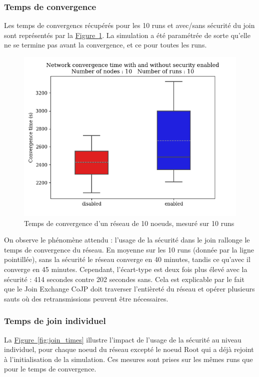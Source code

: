 \documentclass[]{report}
\newcommand{\wordlink}[2]{\hyperref[#2]{#1~\ref{#2}}}
\begin{document}
\subsubsection{Temps de convergence}

Les temps de convergencs récupérés pour les 10 runs et avec/sans sécurité du join sont représentés par la \wordlink{Figure}{fig:convergence}. La simulation a été paramétrée de sorte qu'elle ne se termine pas avant la convergence, et ce pour toutes les runs.

	\begin{figure}[!h]
	\centering
	\includegraphics[width=0.7\linewidth]{results/secjoin/boxesTimeConvergence10.png}
	\caption{Temps de convergence d'un réseau de 10 noeuds, mesuré sur 10 runs}
	\label{fig:convergence}
	\end{figure}

\vspace{0.1cm}
On observe le phénomène attendu : l'usage de la sécurité dans le join rallonge le temps de convergence du réseau. En moyenne sur les 10 runs (donnée par la ligne pointillée), sans la sécurité le réseau converge en 40 minutes, tandis ce qu'avec il converge en 45 minutes. Cependant, l'écart-type est deux fois plus élevé avec la sécurité : 414 secondes contre 202 secondes sans. Cela est explicable par le fait que le Join Exchange CoJP doit traverser l'entièreté du réseau et opérer plusieurs sauts où des retransmissions peuvent être nécessaires.

\newpage


\subsubsection{Temps de join individuel}

La \wordlink{Figure}{fig:join_times} illustre l'impact de l'usage de la sécurité au niveau individuel, pour chaque noeud du réseau excepté le noeud Root qui a déjà rejoint à l'initialisation de la simulation. Ces mesures sont prises sur les mêmes runs que pour le temps de convergence. 
\end{document}
